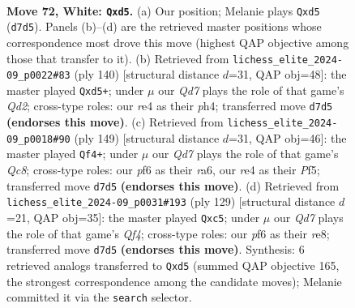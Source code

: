 \documentclass[11pt]{article}
\begin{document}
\clearpage

\begin{figure}[p]\centering
\begin{subfigure}{0.46\textwidth}\centering
\resizebox{\linewidth}{!}{%
\newchessgame
\chessboard[
  setfen={8/3Q2qk/5p2/3p4/4r3/6P1/6KP/8 w - - 24 72},
  showmover=false,
  pgfstyle=straightmove, color=movearrow, markmove={d7-d5}
]}
\caption{}
\end{subfigure}\hfill
\begin{subfigure}{0.46\textwidth}\centering
\resizebox{\linewidth}{!}{%
\newchessgame
\chessboard[
  setfen={8/8/6p1/3q3k/P6p/1P6/K2Q4/8 w - - 0 71},
  showmover=false,
  pgfstyle=straightmove, color=movearrow, markmove={d2-d5}
]}
\caption{}
\end{subfigure}
\\[4pt]
\begin{subfigure}{0.46\textwidth}\centering
\resizebox{\linewidth}{!}{%
\newchessgame
\chessboard[
  setfen={8/2k2p2/R4P2/5p2/8/2P5/p4K2/2q2Q2 b - - 13 75},
  showmover=false,
  pgfstyle=straightmove, color=movearrow, markmove={c1-f4}
]}
\caption{}
\end{subfigure}\hfill
\begin{subfigure}{0.46\textwidth}\centering
\resizebox{\linewidth}{!}{%
\newchessgame
\chessboard[
  setfen={4R3/kp1K4/p3Q3/2P2q2/8/8/8/8 b - - 22 65},
  showmover=false,
  pgfstyle=straightmove, color=movearrow, markmove={f5-c5}
]}
\caption{}
\end{subfigure}
\caption{\textbf{Move 72, White: \texttt{Qxd5}.} (a) Our position; Melanie plays \texttt{Qxd5} (\texttt{d7d5}). Panels (b)--(d) are the retrieved master positions whose correspondence most drove this move (highest QAP objective among those that transfer to it). (b) Retrieved from \texttt{lichess\_elite\_2024-09\_p0022\#83} (ply 140) [structural distance $d$=31, QAP obj=48]: the master played \texttt{Qxd5+}; under $\mu$ our \emph{Qd7} plays the role of that game's \emph{Qd2}; cross-type roles: our \emph{r}e4 as their \emph{p}h4; transferred move \texttt{d7d5} \textbf{(endorses this move)}. (c) Retrieved from \texttt{lichess\_elite\_2024-09\_p0018\#90} (ply 149) [structural distance $d$=31, QAP obj=46]: the master played \texttt{Qf4+}; under $\mu$ our \emph{Qd7} plays the role of that game's \emph{Qc8}; cross-type roles: our \emph{p}f6 as their \emph{r}a6, our \emph{r}e4 as their \emph{P}f5; transferred move \texttt{d7d5} \textbf{(endorses this move)}. (d) Retrieved from \texttt{lichess\_elite\_2024-09\_p0031\#193} (ply 129) [structural distance $d$=21, QAP obj=35]: the master played \texttt{Qxc5}; under $\mu$ our \emph{Qd7} plays the role of that game's \emph{Qf4}; cross-type roles: our \emph{p}f6 as their \emph{r}e8; transferred move \texttt{d7d5} \textbf{(endorses this move)}. Synthesis: 6 retrieved analogs transferred to \texttt{Qxd5} (summed QAP objective 165, the strongest correspondence among the candidate moves); Melanie committed it via the \texttt{search} selector.}
\label{fig:thought-m142}
\end{figure}
\end{document}
